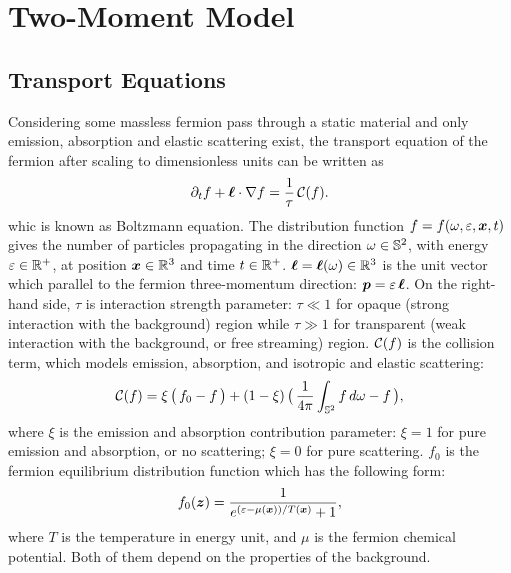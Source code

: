 \section{Two-Moment Model}

\subsection{Transport Equations}
Considering some massless fermion pass through a static material and only emission, absorption and elastic scattering exist, the transport equation of the fermion after scaling to dimensionless units can be written as
\begin{equation}
  \pd{f}{t}+\vect{\ell}\cdot\nabla f
  =\f{1}{\tau}\,\cC(f).
  \label{eq:boltzmann}
\end{equation}
whic is known as Boltzmann equation.
The distribution function $f = f(\omega,\varepsilon,\boldsymbol{x},t)$ gives the number of particles propagating in the direction $\omega\in\mathbb{S}^{2}$, with energy $\varepsilon\in\mathbb{R}^{+}$, at position $\boldsymbol{x}\in\mathbb{R}^{3}$ and time $t\in\mathbb{R}^{+}$.  
$\boldsymbol{\ell} = \boldsymbol{\ell}(\omega)\in\mathbb{R}^{3}$ is the unit vector which parallel to the fermion three-momentum direction: $\boldsymbol{p}=\varepsilon\,\boldsymbol{\ell}$.
On the right-hand side, $\tau$ is interaction strength parameter: $\tau\ll1$ for opaque (strong interaction with the background) region while $\tau\gg1$ for transparent (weak interaction with the background, or free streaming) region.
$\mathcal{C}(f)$ is the collision term, which models emission, absorption, and isotropic and elastic scattering: 
\begin{equation}
  \cC(f)=\xi\,\big(\,f_{0}-f\,\big)
  +(1-\xi)\,\big(\,\f{1}{4\pi}\int_{\bbS^{2}}f\,d\omega-f\,\big),
  \label{eq:collisionTerm}
\end{equation}
where $\xi$ is the emission and absorption contribution parameter: $\xi = 1$ for pure emission and absorption, or no scattering; $\xi = 0$ for pure scattering. 
$f_{0}$ is the fermion equilibrium distribution function which has the following form:
\begin{equation}
  f_{0}(\vect{z})=\f{1}{e^{(\varepsilon-\mu(\vect{x}))/T(\vect{x})}+1},  
  \label{eq:fermiDirac}
\end{equation}
where $T$ is the temperature in energy unit, and $\mu$ is the fermion chemical potential.
Both of them depend on the properties of the background.

